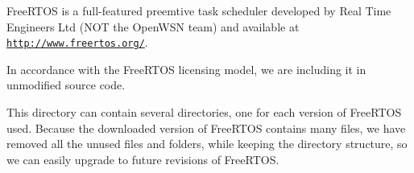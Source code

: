 Free\+R\+T\+OS is a full-\/featured preemtive task scheduler developed by Real Time Engineers Ltd (N\+OT the Open\+W\+SN team) and available at \href{http://www.freertos.org/}{\tt http\+://www.\+freertos.\+org/}.

In accordance with the Free\+R\+T\+OS licensing model, we are including it in unmodified source code.

This directory can contain several directories, one for each version of Free\+R\+T\+OS used. Because the downloaded version of Free\+R\+T\+OS contains many files, we have removed all the unused files and folders, while keeping the directory structure, so we can easily upgrade to future revisions of Free\+R\+T\+OS. 